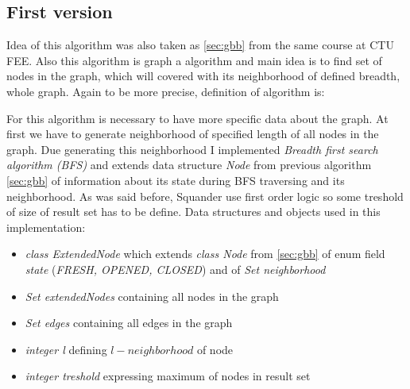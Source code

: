 \documentclass[11pt,twoside,a4paper]{book}
\begin{document}
\subsection{First version}
\label{sub:ldsFrstVer}
Idea of this algorithm was also taken as \ref{sec:gbb} from the same course at
CTU FEE. Also this algorithm is graph a algorithm and main idea is to find set
of nodes in the graph, which will covered with its neighborhood of defined
breadth, whole graph. Again to be more precise, definition of algorithm is:

\begin{center}
\end{center}

For this algorithm is necessary to have more specific data about the graph. At
first we have to generate neighborhood of specified length of all nodes in the
graph. Due generating this neighborhood I implemented \textit{Breadth
first search algorithm (BFS)} and extends data structure \textit{Node} from
previous algorithm \ref{sec:gbb} of information about its state during BFS
traversing and its neighborhood. As was said before, Squander use first
order logic so some treshold of size of result set has to be define. Data
structures and objects used in this implementation:

\begin{itemize}
  \item \textit{class ExtendedNode} which extends \textit{class Node} from
  \ref{sec:gbb} of enum field \textit{state} (\textit{FRESH, OPENED, CLOSED})
  and of \textit{Set neighborhood}
  \item \textit{Set extendedNodes} containing all nodes in the graph
\item \textit{Set edges} containing all edges in the graph
  \item \textit{integer l} defining $l-neighborhood$ of node
  \item \textit{integer treshold} expressing maximum of nodes in result set
\end{itemize}
\end{document}
